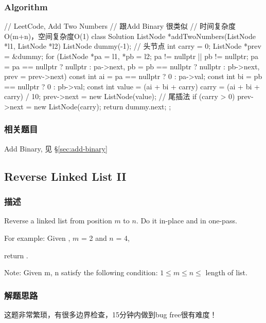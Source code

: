\subsubsection{Algorithm}
\begin{Code}
	// LeetCode, Add Two Numbers
	// 跟Add Binary 很类似
	// 时间复杂度O(m+n)，空间复杂度O(1)
	class Solution {
		ListNode *addTwoNumbers(ListNode *l1, ListNode *l2) {
			ListNode dummy(-1); // 头节点
			int carry = 0;
			ListNode *prev = &dummy;
			for (ListNode *pa = l1, *pb = l2;
				pa != nullptr || pb != nullptr;
				pa = pa == nullptr ? nullptr : pa->next,
				pb = pb == nullptr ? nullptr : pb->next,
				prev = prev->next) {
					const int ai = pa == nullptr ? 0 : pa->val;
					const int bi = pb == nullptr ? 0 : pb->val;
					const int value = (ai + bi + carry) %
					carry = (ai + bi + carry) / 10;
					prev->next = new ListNode(value); // 尾插法
			}
			if (carry > 0)
				prev->next = new ListNode(carry);
			return dummy.next;
		}
	};
\end{Code}


\subsubsection{相关题目}

\begindot
\item Add Binary, 见 \S \ref{sec:add-binary}
\myenddot


\subsection{Reverse Linked List II}
\label{sec:reverse-linked-list-ii}


\subsubsection{描述}
Reverse a linked list from position $m$ to $n$. Do it in-place and in one-pass.

For example:
Given , $m$ = 2 and $n$ = 4,

return .

Note:
Given m, n satisfy the following condition:
$1 \leq m \leq  n \leq $ length of list.


\subsubsection{解题思路}
这题非常繁琐，有很多边界检查，15分钟内做到bug free很有难度！


